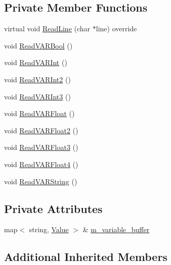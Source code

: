 \subsection*{Private Member Functions}
\begin{DoxyCompactItemize}
\item 
virtual void \hyperlink{classmage_1_1_v_a_r_reader_ae6c88d1a081c8e127f1e1258a3c2660d}{Read\+Line} (char $\ast$line) override
\item 
void \hyperlink{classmage_1_1_v_a_r_reader_a06368ab2f488f2d88008c73beb35acc2}{Read\+V\+A\+R\+Bool} ()
\item 
void \hyperlink{classmage_1_1_v_a_r_reader_a9b78c642785ef8a9c487ba9cc84842c4}{Read\+V\+A\+R\+Int} ()
\item 
void \hyperlink{classmage_1_1_v_a_r_reader_a33bc794769330f6d4593dfbfceaa0c95}{Read\+V\+A\+R\+Int2} ()
\item 
void \hyperlink{classmage_1_1_v_a_r_reader_a8a809be1eeebc2649e16524d8c65529f}{Read\+V\+A\+R\+Int3} ()
\item 
void \hyperlink{classmage_1_1_v_a_r_reader_a2d36a7cf1547cd795ee451c0219dd9f3}{Read\+V\+A\+R\+Float} ()
\item 
void \hyperlink{classmage_1_1_v_a_r_reader_a03a2cfead8f57843bb4a2c9bc8d00b67}{Read\+V\+A\+R\+Float2} ()
\item 
void \hyperlink{classmage_1_1_v_a_r_reader_a96e2af0f4462192867da2beead30ca67}{Read\+V\+A\+R\+Float3} ()
\item 
void \hyperlink{classmage_1_1_v_a_r_reader_a6f14f9f9696e32090f262682c519bc10}{Read\+V\+A\+R\+Float4} ()
\item 
void \hyperlink{classmage_1_1_v_a_r_reader_a52bb3a842c7887099a4dff875a3608a0}{Read\+V\+A\+R\+String} ()
\end{DoxyCompactItemize}
\subsection*{Private Attributes}
\begin{DoxyCompactItemize}
\item 
map$<$ string, \hyperlink{namespacemage_aa1fe0628487e0706e44efdc62dbdb3a2}{Value} $>$ \& \hyperlink{classmage_1_1_v_a_r_reader_a379cbdc2840af20329fe930ac3852356}{m\+\_\+variable\+\_\+buffer}
\end{DoxyCompactItemize}
\subsection*{Additional Inherited Members}


